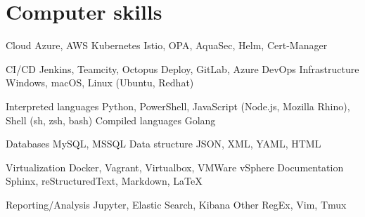 \section{Computer skills}

\cvcomputer %
  {Cloud}
    {Azure, AWS}
  {Kubernetes}
    {Istio, OPA, AquaSec, Helm, Cert-Manager}

  \cvcomputer %
  {CI/CD}
    {Jenkins, Teamcity, Octopus Deploy, GitLab, Azure DevOps}
  {Infrastructure}
    {Windows, macOS, Linux (Ubuntu, Redhat)}

\cvcomputer %
  {Interpreted languages}
    {Python, PowerShell, JavaScript (Node.js, Mozilla Rhino), Shell (sh, zsh, bash)}
  {Compiled languages}
    {Golang}

\cvcomputer %
  {Databases}
    {MySQL, MSSQL}
  {Data structure}
    {JSON, XML, YAML, HTML}

\cvcomputer %
  {Virtualization}
    {Docker, Vagrant, Virtualbox, VMWare vSphere}
  {Documentation}
    {Sphinx, reStructuredText, Markdown, LaTeX}

\cvcomputer %
  {Reporting/Analysis}
    {Jupyter, Elastic Search, Kibana}
  {Other}
    {RegEx, Vim, Tmux}

\closesection{}
